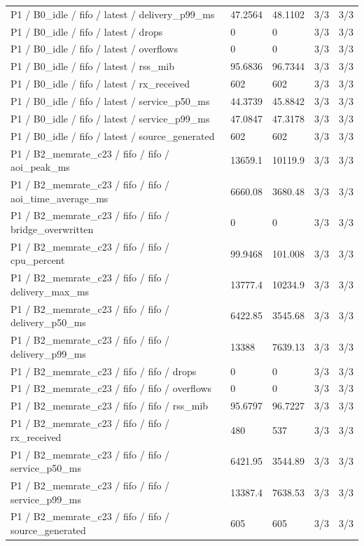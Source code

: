 \begin{tabular}{@{}lllll@{}}
P1 / B0\_idle / fifo / latest / delivery\_p99\_ms & 47.2564 & 48.1102 & 3/3 & 3/3 \\
P1 / B0\_idle / fifo / latest / drops & 0 & 0 & 3/3 & 3/3 \\
P1 / B0\_idle / fifo / latest / overflows & 0 & 0 & 3/3 & 3/3 \\
P1 / B0\_idle / fifo / latest / rss\_mib & 95.6836 & 96.7344 & 3/3 & 3/3 \\
P1 / B0\_idle / fifo / latest / rx\_received & 602 & 602 & 3/3 & 3/3 \\
P1 / B0\_idle / fifo / latest / service\_p50\_ms & 44.3739 & 45.8842 & 3/3 & 3/3 \\
P1 / B0\_idle / fifo / latest / service\_p99\_ms & 47.0847 & 47.3178 & 3/3 & 3/3 \\
P1 / B0\_idle / fifo / latest / source\_generated & 602 & 602 & 3/3 & 3/3 \\
P1 / B2\_memrate\_c23 / fifo / fifo / aoi\_peak\_ms & 13659.1 & 10119.9 & 3/3 & 3/3 \\
P1 / B2\_memrate\_c23 / fifo / fifo / aoi\_time\_average\_ms & 6660.08 & 3680.48 & 3/3 & 3/3 \\
P1 / B2\_memrate\_c23 / fifo / fifo / bridge\_overwritten & 0 & 0 & 3/3 & 3/3 \\
P1 / B2\_memrate\_c23 / fifo / fifo / cpu\_percent & 99.9468 & 101.008 & 3/3 & 3/3 \\
P1 / B2\_memrate\_c23 / fifo / fifo / delivery\_max\_ms & 13777.4 & 10234.9 & 3/3 & 3/3 \\
P1 / B2\_memrate\_c23 / fifo / fifo / delivery\_p50\_ms & 6422.85 & 3545.68 & 3/3 & 3/3 \\
P1 / B2\_memrate\_c23 / fifo / fifo / delivery\_p99\_ms & 13388 & 7639.13 & 3/3 & 3/3 \\
P1 / B2\_memrate\_c23 / fifo / fifo / drops & 0 & 0 & 3/3 & 3/3 \\
P1 / B2\_memrate\_c23 / fifo / fifo / overflows & 0 & 0 & 3/3 & 3/3 \\
P1 / B2\_memrate\_c23 / fifo / fifo / rss\_mib & 95.6797 & 96.7227 & 3/3 & 3/3 \\
P1 / B2\_memrate\_c23 / fifo / fifo / rx\_received & 480 & 537 & 3/3 & 3/3 \\
P1 / B2\_memrate\_c23 / fifo / fifo / service\_p50\_ms & 6421.95 & 3544.89 & 3/3 & 3/3 \\
P1 / B2\_memrate\_c23 / fifo / fifo / service\_p99\_ms & 13387.4 & 7638.53 & 3/3 & 3/3 \\
P1 / B2\_memrate\_c23 / fifo / fifo / source\_generated & 605 & 605 & 3/3 & 3/3 \\

\end{tabular}
